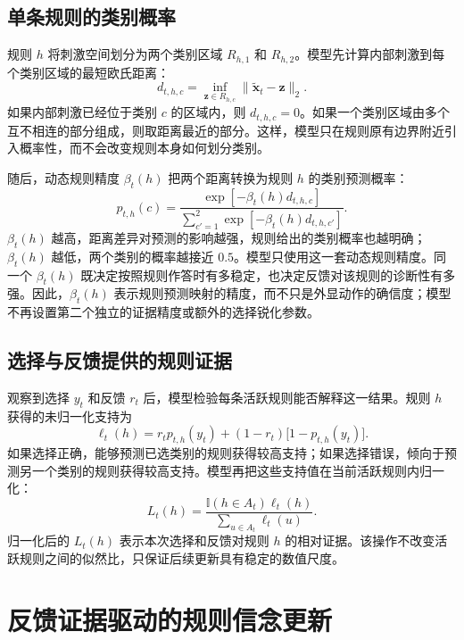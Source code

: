 \documentclass[12pt]{article}
\newcommand{\ind}{\mathbb I}
\begin{document}
\subsection{单条规则的类别概率}

规则 $h$ 将刺激空间划分为两个类别区域 $R_{h,1}$ 和 $R_{h,2}$。模型先计算内部刺激到每个类别区域的最短欧氏距离：
\begin{equation}
d_{t,h,c}
=\inf_{\bm z\in R_{h,c}}
\lVert\widetilde{\bm x}_t-\bm z\rVert_2.
\label{eq:boundary-distance}
\end{equation}
如果内部刺激已经位于类别 $c$ 的区域内，则 $d_{t,h,c}=0$。如果一个类别区域由多个互不相连的部分组成，则取距离最近的部分。这样，模型只在规则原有边界附近引入概率性，而不会改变规则本身如何划分类别。

随后，动态规则精度 $\beta_t(h)$ 把两个距离转换为规则 $h$ 的类别预测概率：
\begin{equation}
p_{t,h}(c)
=
\frac{\exp[-\beta_t(h)d_{t,h,c}]}
{\sum_{c'=1}^{2}\exp[-\beta_t(h)d_{t,h,c'}]}.
\label{eq:rule-emission}
\end{equation}
$\beta_t(h)$ 越高，距离差异对预测的影响越强，规则给出的类别概率也越明确；$\beta_t(h)$ 越低，两个类别的概率越接近 $0.5$。模型只使用这一套动态规则精度。同一个 $\beta_t(h)$ 既决定按照规则作答时有多稳定，也决定反馈对该规则的诊断性有多强。因此，$\beta_t(h)$ 表示规则预测映射的精度，而不只是外显动作的确信度；模型不再设置第二个独立的证据精度或额外的选择锐化参数。

\subsection{选择与反馈提供的规则证据}

观察到选择 $y_t$ 和反馈 $r_t$ 后，模型检验每条活跃规则能否解释这一结果。规则 $h$ 获得的未归一化支持为
\begin{equation}
\ell_t(h)
=r_t p_{t,h}(y_t)
+(1-r_t)\bigl[1-p_{t,h}(y_t)\bigr].
\label{eq:feedback-support}
\end{equation}
如果选择正确，能够预测已选类别的规则获得较高支持；如果选择错误，倾向于预测另一个类别的规则获得较高支持。模型再把这些支持值在当前活跃规则内归一化：
\begin{equation}
L_t(h)
=
\frac{\ind(h\in A_t)\ell_t(h)}
{\sum_{u\in A_t}\ell_t(u)}.
\label{eq:normalized-likelihood}
\end{equation}
归一化后的 $L_t(h)$ 表示本次选择和反馈对规则 $h$ 的相对证据。该操作不改变活跃规则之间的似然比，只保证后续更新具有稳定的数值尺度。


\section{反馈证据驱动的规则信念更新}
\end{document}
